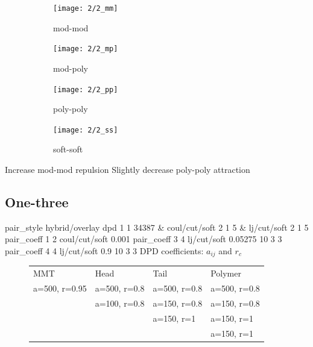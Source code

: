 \documentclass[a4paper]{article}
\begin{document}
\begin{figure}[H]
\begin{subfigure}{0.24\textwidth}
  \centering
  \texttt{[image: 2/2\_mm]}
  \caption{mod-mod}
\end{subfigure}
\begin{subfigure}{0.24\textwidth}
  \centering
  \texttt{[image: 2/2\_mp]}
  \caption{mod-poly}
\end{subfigure}
\begin{subfigure}{0.24\textwidth}
  \centering
  \texttt{[image: 2/2\_pp]}
  \caption{poly-poly}
\end{subfigure}
\begin{subfigure}{0.24\textwidth}
  \centering
  \texttt{[image: 2/2\_ss]}
  \caption{soft-soft}
\end{subfigure}
\caption{}
\label{fig_1}
\end{figure}
Increase mod-mod repulsion\newline
Slightly decrease poly-poly attraction


\subsection*{One-three}
pair\_style hybrid/overlay dpd 1 1 34387 \& coul/cut/soft 2 1 5 \& 
lj/cut/soft 2 1 5\newline
pair\_coeff 1 2 coul/cut/soft 0.001\newline
pair\_coeff 3 4 lj/cut/soft 0.05275 10 3 3\newline
pair\_coeff 4 4 lj/cut/soft 0.9     10 3 3\newline
DPD coefficients: $a_{ij}$ and $r_c$
\begin{figure}[H]\begin{tabular}{llll}
MMT           & Head         & Tail         & Polymer      \\
a=500, r=0.95 & a=500, r=0.8 & a=500, r=0.8 & a=500, r=0.8 \\
              & a=100, r=0.8 & a=150, r=0.8 & a=150, r=0.8 \\
              &              & a=150, r=1   & a=150, r=1   \\
              &              &              & a=150, r=1   \\
\end{tabular}\end{figure}
\end{document}

